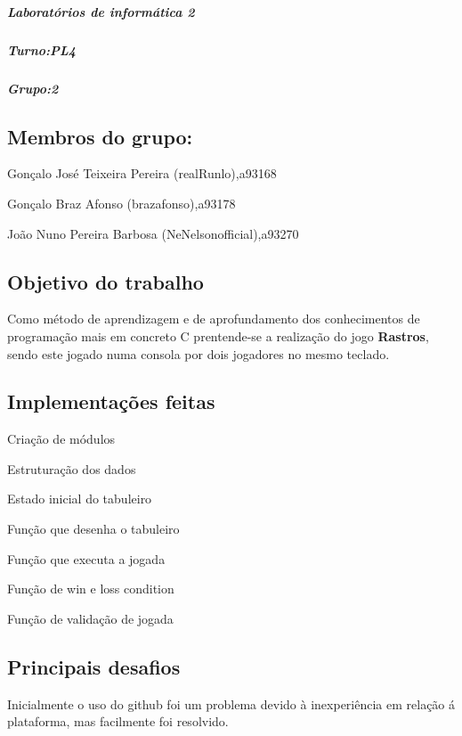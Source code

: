 \subparagraph*{Laboratórios de informática 2}

\subparagraph*{Turno\+:P\+L4}

\subparagraph*{Grupo\+:2}

\subsection*{Membros do grupo\+:}


\begin{DoxyItemize}
\item Gonçalo José Teixeira Pereira (real\+Runlo),a93168
\item Gonçalo Braz Afonso (brazafonso),a93178
\item João Nuno Pereira Barbosa (Ne\+Nelsonofficial),a93270
\end{DoxyItemize}

\subsection*{Objetivo do trabalho}

Como método de aprendizagem e de aprofundamento dos conhecimentos de programação mais em concreto C prentende-\/se a realização do jogo {\bfseries Rastros}, sendo este jogado numa consola por dois jogadores no mesmo teclado.

\subsection*{Implementações feitas}


\begin{DoxyEnumerate}
\item Criação de módulos
\item Estruturação dos dados
\item Estado inicial do tabuleiro
\item Função que desenha o tabuleiro
\item Função que executa a jogada
\item Função de win e loss condition
\item Função de validação de jogada \subsection*{Principais desafios}
\end{DoxyEnumerate}

Inicialmente o uso do github foi um problema devido à inexperiência em relação á plataforma, mas facilmente foi resolvido. 